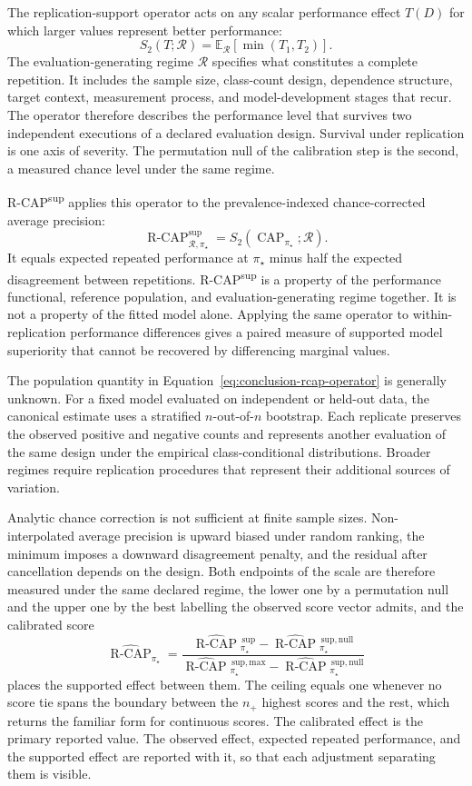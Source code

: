 \documentclass[11pt]{article}
\newcommand{\CAP}{\operatorname{CAP}}
\newcommand{\Regime}{\mathcal{R}}
\newcommand{\E}{\mathbb{E}}
\newcommand{\RCAPfull}{\operatorname{R\text{-}CAP}^{\mathrm{sup}}_{\Regime,\pi_\star}}
\newcommand{\RCAPHat}{\widehat{\operatorname{R\text{-}CAP}}{}^{\,\mathrm{sup}}_{\pi_\star}}
\newcommand{\RCAPnullHat}{\widehat{\operatorname{R\text{-}CAP}}{}^{\,\mathrm{sup,null}}_{\pi_\star}}
\newcommand{\RCAPcalHat}{\widehat{\operatorname{R\text{-}CAP}}_{\pi_\star}}
\newcommand{\RCAPmaxHat}{\widehat{\operatorname{R\text{-}CAP}}{}^{\,\mathrm{sup,max}}_{\pi_\star}}
\theoremstyle{remark}
\begin{document}
The replication-support operator acts on any scalar performance effect $T(D)$ for which larger values represent better performance:
\[
S_2(T;\Regime)
=
\E_{\Regime}
\left[
\min(T_1,T_2)
\right].
\]
The evaluation-generating regime $\Regime$ specifies what constitutes a complete repetition. It includes the sample size, class-count design, dependence structure, target context, measurement process, and model-development stages that recur. The operator therefore describes the performance level that survives two independent executions of a declared evaluation design. Survival under replication is one axis of severity. The permutation null of the calibration step is the second, a measured chance level under the same regime.

R-CAP\textsuperscript{sup} applies this operator to the prevalence-indexed chance-corrected average precision:
\begin{equation}
\RCAPfull
=
S_2(\CAP_{\pi_\star};\Regime).
\label{eq:conclusion-rcap-operator}
\end{equation}
It equals expected repeated performance at $\pi_\star$ minus half the expected disagreement between repetitions. R-CAP\textsuperscript{sup} is a property of the performance functional, reference population, and evaluation-generating regime together. It is not a property of the fitted model alone. Applying the same operator to within-replication performance differences gives a paired measure of supported model superiority that cannot be recovered by differencing marginal values.

The population quantity in Equation~\eqref{eq:conclusion-rcap-operator} is generally unknown. For a fixed model evaluated on independent or held-out data, the canonical estimate uses a stratified $n$-out-of-$n$ bootstrap. Each replicate preserves the observed positive and negative counts and represents another evaluation of the same design under the empirical class-conditional distributions. Broader regimes require replication procedures that represent their additional sources of variation.

Analytic chance correction is not sufficient at finite sample sizes. Non-interpolated average precision is upward biased under random ranking, the minimum imposes a downward disagreement penalty, and the residual after cancellation depends on the design. Both endpoints of the scale are therefore measured under the same declared regime, the lower one by a permutation null and the upper one by the best labelling the observed score vector admits, and the calibrated score
\[
\RCAPcalHat
=
\frac{\RCAPHat-\RCAPnullHat}{\RCAPmaxHat-\RCAPnullHat}
\]
places the supported effect between them. The ceiling equals one whenever no score tie spans the boundary between the $n_+$ highest scores and the rest, which returns the familiar form for continuous scores. The calibrated effect is the primary reported value. The observed effect, expected repeated performance, and the supported effect are reported with it, so that each adjustment separating them is visible.
\end{document}

